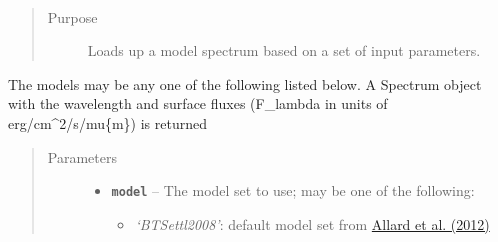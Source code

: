 \documentclass[letterpaper,10pt,english]{sphinxmanual}
\begin{document}
\begin{fulllineitems}
\label{api:splat_model.loadModel}~\begin{quote}\begin{description}
\item[{Purpose}] \leavevmode
Loads up a model spectrum based on a set of input parameters.

\end{description}\end{quote}

The models may be any one of the following listed below.
A Spectrum object with the wavelength and surface fluxes (F\_lambda in units of erg/cm\textasciicircum{}2/s/mu\{m\}) is returned
\begin{quote}\begin{description}
\item[{Parameters}] \leavevmode\begin{itemize}
\item {} 
\textbf{\texttt{model}} -- 
The model set to use; may be one of the following:
\begin{itemize}
\item {} 
\emph{`BTSettl2008'}: default model set from \href{http://adsabs.harvard.edu/abs/2012RSPTA.370.2765A}{Allard et al. (2012)}

\end{itemize}


\end{itemize}
\end{description}
\end{quote}
\end{fulllineitems}
\end{document}
